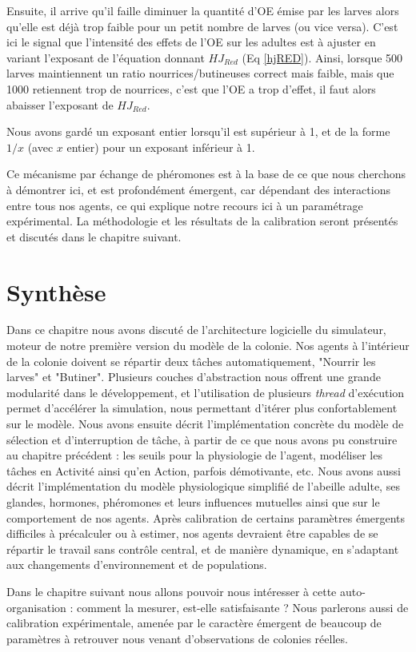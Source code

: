 	Ensuite, il arrive qu'il faille diminuer la quantité d'OE émise par les larves alors qu'elle est déjà trop faible pour un petit nombre de larves (ou vice versa). C'est ici le signal que l'intensité des effets de l'OE sur les adultes est à ajuster en variant l'exposant de l'équation donnant $HJ_{Red}$ (Eq \ref{hjRED}). Ainsi, lorsque 500 larves maintiennent un ratio nourrices/butineuses correct mais faible, mais que 1000 retiennent trop de nourrices, c'est que l'OE a trop d'effet, il faut alors abaisser l'exposant de $HJ_{Red}$. 
	
	Nous avons gardé un exposant entier lorsqu'il est supérieur à 1, et de la forme $1/x$ (avec $x$ entier) pour un exposant inférieur à 1.
	
	
	Ce mécanisme par échange de phéromones est à la base de ce que nous cherchons à démontrer ici, et est profondément émergent, car dépendant des interactions entre tous nos agents, ce qui explique notre recours ici à un paramétrage expérimental. La méthodologie et les résultats de la calibration seront présentés et discutés dans le chapitre suivant.
			
	\section*{Synthèse}
		Dans ce chapitre nous avons discuté de l'architecture logicielle du simulateur, moteur de notre première version du modèle de la colonie. Nos agents à l'intérieur de la colonie doivent se répartir deux tâches automatiquement, "Nourrir les larves" et "Butiner". Plusieurs couches d'abstraction nous offrent une grande modularité dans le développement, et l'utilisation de plusieurs \textit{thread} d'exécution permet d'accélérer la simulation, nous permettant d'itérer plus confortablement sur le modèle. Nous avons ensuite décrit l'implémentation concrète du modèle de sélection et d'interruption de tâche, à partir de ce que nous avons pu construire au chapitre précédent : les seuils pour la physiologie de l'agent, modéliser les tâches en Activité ainsi qu'en Action, parfois démotivante, etc. Nous avons aussi décrit l'implémentation du modèle physiologique simplifié de l'abeille adulte, ses glandes, hormones, phéromones et leurs influences mutuelles ainsi que sur le comportement de nos agents. Après calibration de certains paramètres émergents difficiles à précalculer ou à estimer, nos agents devraient être capables de se répartir le travail sans contrôle central, et de manière dynamique, en s'adaptant aux changements d'environnement et de populations. 
		
		Dans le chapitre suivant nous allons pouvoir nous intéresser à cette auto-organisation : comment la mesurer, est-elle satisfaisante ? Nous parlerons aussi de calibration expérimentale, amenée par le caractère émergent de beaucoup de paramètres à retrouver nous venant d'observations de colonies réelles.
		